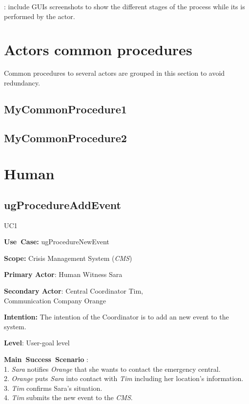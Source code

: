 : include GUIs screenshots to show the
different stages of the process while its is performed by the actor.



\section{Actors common procedures}
Common procedures to several actors are grouped in this section to avoid
redundancy.

\subsection{MyCommonProcedure1}

\subsection{MyCommonProcedure2}


\section{Human}

\subsection{ugProcedureAddEvent}
\begin{lyxlist}{UC1}
\small{
\item [\textbf{Use~Case:}] ugProcedureNewEvent
\item [\textbf{Scope:}] Crisis Management System (\emph{CMS})
\item [\textbf{Primary Actor}:] Human Witness Sara
\item [\textbf{Secondary Actor}:] Central Coordinator Tim,\\
                  Communication Company Orange
\item [\textbf{Intention:}]The intention of the Coordinator is to add an new
event to the system.
\item [\textbf{Level}:]User-goal level
\item [\textbf{Main~Success~Scenario}]:\\
1. \emph{Sara} notifies \emph{Orange} that she wants to contact the emergency
central.\\
2. \emph{Orange} puts \emph{Sara} into contact with \emph{Tim} including her
location's information.\\
3. \emph{Tim} confirms \emph{}{Sara}'s situation.\\
4. \emph{Tim} submits the new event to the \emph{CMS}.\\
}
\end{lyxlist}

